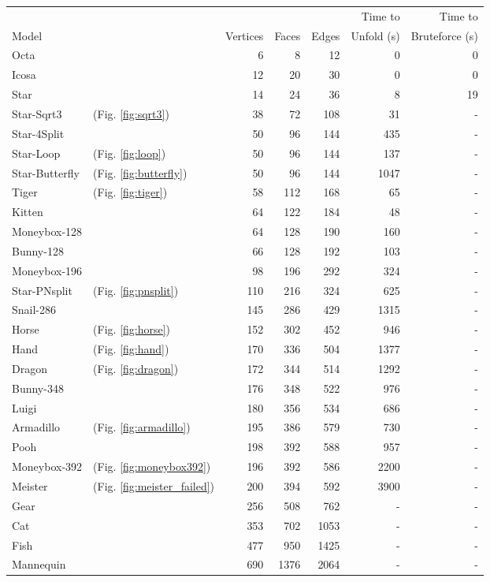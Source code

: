 \documentclass[draft,final]{vutinfth} %
\begin{document}
\begingroup
\centering
\begin{tabular}{|ll|rrr|r|r|}
\hline
& & & & &  Time to & Time to \\
Model & & Vertices & Faces & Edges & Unfold (s) & Bruteforce (s) \\
\hline
Octa & & 6 & 8 & 12 & 0 & 0 \\
Icosa & & 12& 20& 30 & 0 & 0 \\
Star & & 14& 24& 36 & 8 & 19 \\
Star-Sqrt3 & (Fig. \ref{fig:sqrt3}) & 38& 72& 108 & 31 & - \\
Star-4Split & & 50& 96& 144 & 435 & -\\
Star-Loop & (Fig. \ref{fig:loop}) & 50& 96& 144 & 137 & -\\
Star-Butterfly & (Fig. \ref{fig:butterfly}) & 50& 96& 144 & 1047 & -\\
Tiger & (Fig. \ref{fig:tiger}) & 58& 112& 168 & 65 & -\\
Kitten & & 64& 122& 184 & 48 &- \\
Moneybox-128 & & 64& 128& 190 & 160 &- \\
Bunny-128 & & 66& 128& 192 & 103 &- \\
Moneybox-196 & & 98& 196& 292 & 324  &-\\
Star-PNsplit & (Fig. \ref{fig:pnsplit}) & 110& 216& 324 & 625 & -\\
Snail-286 & & 145& 286& 429 & 1315 & -\\
Horse & (Fig. \ref{fig:horse}) & 152& 302& 452 & 946  &-\\
Hand & (Fig. \ref{fig:hand}) & 170& 336& 504 & 1377  &-\\
Dragon & (Fig. \ref{fig:dragon}) & 172& 344& 514 & 1292  &-\\
Bunny-348 & & 176& 348& 522 & 976  &-\\
Luigi & & 180& 356& 534 & 686  &-\\
Armadillo & (Fig. \ref{fig:armadillo}) & 195& 386& 579 & 730  &-\\
Pooh & & 198& 392& 588 & 957 &- \\
Moneybox-392 & (Fig. \ref{fig:moneybox392}) & 196& 392& 586 & 2200  &-\\
Meister & (Fig. \ref{fig:meister_failed}) & 200& 394& 592 & 3900 & - \\
Gear & & 256& 508& 762 & - &- \\
Cat & & 353& 702& 1053 & -  &-\\
Fish & & 477& 950& 1425 & -  &-\\
Mannequin & & 690& 1376& 2064 & -  &-\\
\hline
\end{tabular}
\end{document}
